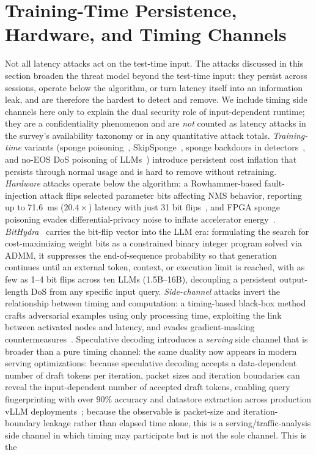 \documentclass[acmsmall,screen,review,nonacm]{acmart}
\begin{document}
\section{Training-Time Persistence, Hardware, and Timing Channels}
\label{sec:hw}
Not all latency attacks act on the test-time input. The attacks discussed in this section broaden the threat model beyond the test-time input: they persist across sessions, operate below the algorithm, or turn latency itself into an information leak, and are therefore the hardest to detect and remove. We include timing side channels here only to explain the dual security role of input-dependent runtime; they are a confidentiality phenomenon and are \emph{not} counted as latency attacks in the survey's availability taxonomy or in any quantitative attack totals. \emph{Training-time} variants (sponge poisoning~\cite{cina2022sponge}, SkipSponge~\cite{telintelo2024skipsponge}, sponge backdoors in detectors~\cite{xiao2024sponge}, and no-EOS DoS poisoning of LLMs~\cite{gao2024dospoisoning}) introduce persistent cost inflation that persists through normal usage and is hard to remove without retraining. \emph{Hardware} attacks operate below the algorithm: a Rowhammer-based fault-injection attack flips selected parameter bits affecting NMS behavior, reporting up to 71.6~ms ($20.4\times$) latency with just 31 bit flips~\cite{sistla2025bitflip}, and FPGA sponge poisoning evades differential-privacy noise to inflate accelerator energy~\cite{akram2025evoweight}. \emph{BitHydra}~\cite{yan2025bithydra} carries the bit-flip vector into the LLM era: formulating the search for cost-maximizing weight bits as a constrained binary integer program solved via ADMM, it suppresses the end-of-sequence probability so that generation continues until an external token, context, or execution limit is reached, with as few as 1--4 bit flips across ten LLMs (1.5B--16B), decoupling a persistent output-length DoS from any specific input query. \emph{Side-channel} attacks invert the relationship between timing and computation: a timing-based black-box method crafts adversarial examples using only processing time, exploiting the link between activated nodes and latency, and evades gradient-masking countermeasures~\cite{nakai2021timing}. Speculative decoding introduces a \emph{serving} side channel that is broader than a pure timing channel: the same duality now appears in modern serving optimizations: because speculative decoding accepts a data-dependent number of draft tokens per iteration, packet sizes and iteration boundaries can reveal the input-dependent number of accepted draft tokens, enabling query fingerprinting with over $90\%$ accuracy and datastore extraction across production vLLM deployments~\cite{sun2024speculative}; because the observable is packet-size and iteration-boundary leakage rather than elapsed time alone, this is a serving/traffic-analysis side channel in which timing may participate but is not the sole channel. This is the 
\end{document}
